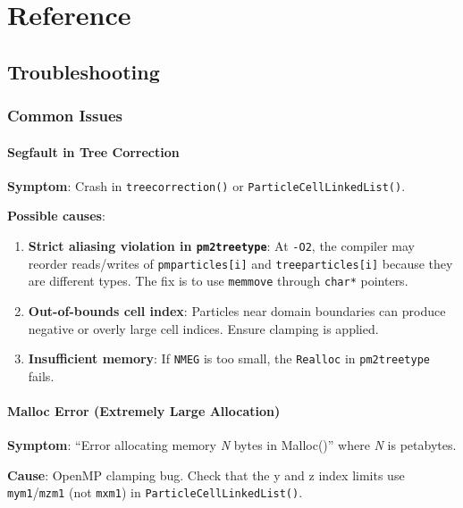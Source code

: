 \documentclass[11pt,fleqn]{book}
\newcommand{\code}[1]{\texttt{#1}}
\begin{document}
\part{Reference}

\chapter{Troubleshooting}
\label{ch:troubleshooting}

\section{Common Issues}

\subsection{Segfault in Tree Correction}

\textbf{Symptom}: Crash in \code{treecorrection()} or \code{ParticleCellLinkedList()}.

\textbf{Possible causes}:
\begin{enumerate}[leftmargin=2em]
  \item \textbf{Strict aliasing violation in \code{pm2treetype}}: At \code{-O2}, the compiler may reorder reads/writes of \code{pmparticles[i]} and \code{treeparticles[i]} because they are different types.  The fix is to use \code{memmove} through \code{char*} pointers.
  \item \textbf{Out-of-bounds cell index}: Particles near domain boundaries can produce negative or overly large cell indices.  Ensure clamping is applied.
  \item \textbf{Insufficient memory}: If \code{NMEG} is too small, the \code{Realloc} in \code{pm2treetype} fails.
\end{enumerate}

\subsection{Malloc Error (Extremely Large Allocation)}

\textbf{Symptom}: ``Error allocating memory \textit{N} bytes in Malloc()'' where \textit{N} is petabytes.

\textbf{Cause}: OpenMP clamping bug.  Check that the y and z index limits use \code{mym1}/\code{mzm1} (not \code{mxm1}) in \code{ParticleCellLinkedList()}.
\end{document}

